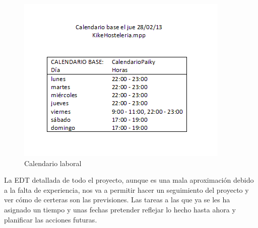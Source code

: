 \documentclass[spanish,a4paper,12pt]{report}	%
\begin{document}
	\begin{figure}[!h]
	\centering
	\includegraphics[scale=0.57]{Calendario.png}
	\caption{Calendario laboral}
	\end{figure}

	La EDT detallada de todo el proyecto, aunque es una mala aproximación debido a la falta de experiencia,
	nos va a permitir hacer un seguimiento del proyecto y ver cómo de certeras son las previsiones. Las tareas
	a las que ya se les ha asignado un tiempo y unas fechas pretender reflejar lo hecho hasta ahora y planificar 
	las acciones futuras.
	
	\newpage
\end{document}
